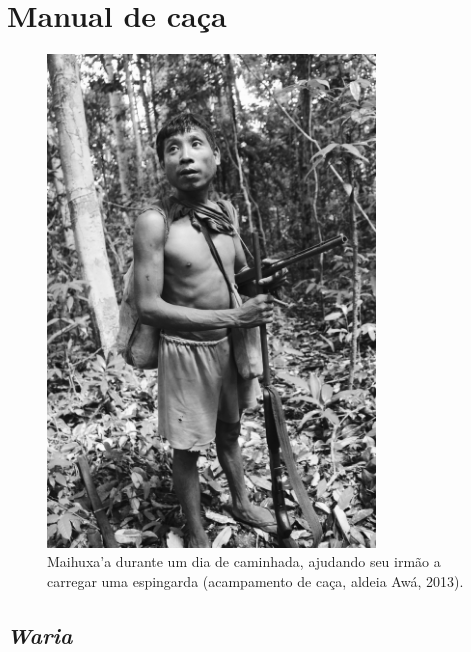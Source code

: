 
\chapter{Manual de caça}\label{manual-de-cauxe7a}

\begin{figure}[H]
\centering
\captionsetup{width=87mm}
  \includegraphics[width=87mm]{./imgs/IMG_1553}
\caption{Maihuxa’a durante um dia de caminhada, ajudando seu irmão a carregar uma espingarda (acampamento de caça, aldeia Awá, 2013).}
\end{figure}

\section{\emph{Waria}}\label{waria}


